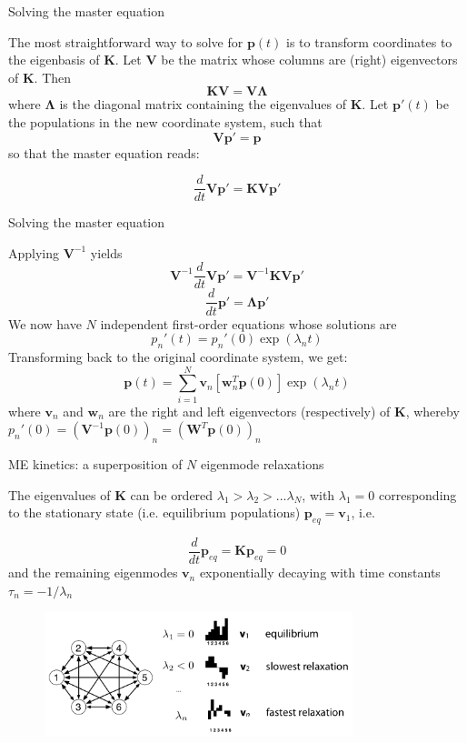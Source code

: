 \documentclass{beamer}
\begin{document}
\begin{frame}{Solving the master equation}

The most straightforward way to solve for $\mathbf{p}(t)$ is to transform coordinates to the eigenbasis of $\mathbf{K}$.  Let $\mathbf{V}$ be the matrix whose columns are (right) eigenvectors of $\mathbf{K}$. Then
$$\mathbf{K} \mathbf{V} = \mathbf{V} \mathbf{\Lambda} $$
where $\mathbf{\Lambda}$ is the diagonal matrix containing the eigenvalues of $\mathbf{K}$.  Let $\mathbf{p}'(t)$ be the populations in the new coordinate system, such that
$$\mathbf{V}\mathbf{p}' = \mathbf{p}$$
so that the master equation reads:

$$\frac{d}{dt} \mathbf{V}\mathbf{p}' = \mathbf{K} \mathbf{V}\mathbf{p}'$$

\end{frame}

\begin{frame}{Solving the master equation}

Applying $\mathbf{V}^{-1}$ yields
$$\mathbf{V}^{-1} \frac{d}{dt} \mathbf{V}\mathbf{p}' = \mathbf{V}^{-1} \mathbf{K} \mathbf{V}\mathbf{p}'$$
$$\frac{d}{dt} \mathbf{p}'=  \mathbf{\Lambda} \mathbf{p}'$$
We now have $N$ independent first-order equations whose solutions are
$$p_n'(t) = p_n'(0) \exp (\lambda_n t)$$
Transforming back to the original coordinate system, we get:
$$\mathbf{p}(t) = \sum_{i=1}^N \mathbf{v}_n [\mathbf{w}_n^T \mathbf{p}(0)] \exp (\lambda_n t)$$
where $\mathbf{v}_n$ and $\mathbf{w}_n$ are the right and left eigenvectors (respectively) of $\mathbf{K}$, whereby $p_n'(0) = (\mathbf{V}^{-1} \mathbf{p}(0))_n = (\mathbf{W}^T \mathbf{p}(0))_n$
\end{frame}


\begin{frame}{ME kinetics: a superposition of $N$ eigenmode relaxations}

The eigenvalues of $\mathbf{K}$ can be ordered $\lambda_1 > \lambda_2 > ... \lambda_N$, with $\lambda_1 = 0$ corresponding to the stationary state (i.e. equilibrium populations) $\mathbf{p}_{eq} = \mathbf{v}_1$, i.e.

$$\frac{d}{dt} \mathbf{p}_{eq} = \mathbf{K} \mathbf{p}_{eq}= 0$$
and the remaining eigenmodes $\mathbf{v}_n$ exponentially decaying with time constants $\tau_n = -1/\lambda_n$

\begin{figure}
\includegraphics[width=0.8\textwidth]{eigenmodes}
\end{figure}

\end{frame}
\end{document}

